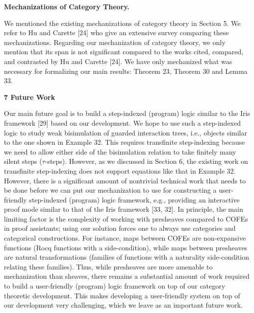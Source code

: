 \documentclass[10pt,a4paper]{article}
\begin{document}
\par\medskip\noindent\textbf{Mechanizations of Category Theory.}\par
 
 
We mentioned the existing mechanizations of category theory in Section 5. We refer to Hu and Carette [24] who give an extensive survey comparing these mechanizations. Regarding our mechanization of category theory, we only mention that its span is not significant compared to the works cited, compared, and contrasted by Hu and Carette [24]. We have only mechanized what was necessary for formalizing our main results: Theorem 23, Theorem 30 and Lemma 33.\par
 
 
 


 
\par\medskip\noindent\textbf{7 Future Work}\par
 
 
Our main future goal is to build a step-indexed (program) logic similar to the Iris framework [29] based on our development. We hope to use such a step-indexed logic to study weak bisimulation of guarded interaction trees, i.e., objects similar to the one shown in Example 32. This requires transfinite step-indexing because we need to allow either side of the bisimulation relation to take finitely many silent steps ($\tau$-steps). However, as we discussed in Section 6, the existing work on transfinite step-indexing does not support equations like that in Example 32. However, there is a significant amount of nontrivial technical work that needs to be done before we can put our mechanization to use for constructing a user-friendly step-indexed (program) logic framework, e.g., providing an interactive proof mode similar to that of the Iris framework [33, 32]. In principle, the main limiting factor is the complexity of working with presheaves compared to COFEs in proof assistants; using our solution forces one to always use categories and categorical constructions. For instance, maps between COFEs are non-expansive functions (Rocq functions with a side-condition), while maps between presheaves are natural transformations (families of functions with a naturality side-condition relating these families). Thus, while presheaves are more amenable to mechanization than sheaves, there remains a substantial amount of work required to build a user-friendly (program) logic framework on top of our category theoretic development. This makes developing a user-friendly system on top of our development very challenging, which we leave as an important future work.\par
 
\end{document}
